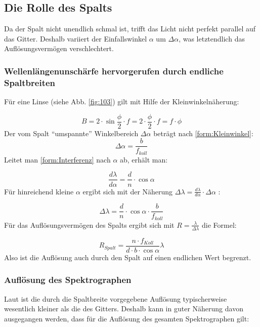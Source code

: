 \subsection{Die Rolle des Spalts}
Da der Spalt nicht unendlich schmal ist, trifft das Licht nicht perfekt parallel auf das Gitter. Deshalb variiert der Einfallswinkel $ \alpha $ um $ \Delta \alpha $, was letztendlich das Auflösungsvermögen verschlechtert.

\subsubsection{Wellenlängenunschärfe hervorgerufen durch endliche Spaltbreiten}
Für eine Linse (siehe Abb. \ref{fig:103}) gilt mit Hilfe der Kleinwinkelnäherung:

\begin{equation}
B = 2\cdot \sin{\frac{\phi}{2}} \cdot f = 2 \cdot \frac{\phi}{2} \cdot f = f \cdot \phi
\label{form:Kleinwinkel}
\end{equation}
Der vom Spalt \enquote{umspannte} Winkelbereich $\Delta \alpha $ beträgt nach \eqref{form:Kleinwinkel}:
\begin{equation}
\Delta \alpha = \frac{b}{f_{koll}}
\end{equation}
Leitet man \eqref{form:Interferenz} nach $ \alpha $ ab, erhält man:

\begin{equation}
\frac{d \lambda}{d \alpha} = \frac{d}{n} \cdot \cos{\alpha}
\end{equation}
Für hinreichend kleine $\alpha$ ergibt sich mit der Näherung $ \Delta \lambda = \frac{d\lambda}{d\alpha} \cdot \Delta \alpha $ :

\begin{equation}
\Delta \lambda = \frac{d}{n} \cdot \cos{\alpha} \cdot \frac{b}{f_{koll}}
\end{equation} 
Für das Auflösungsvermögen des Spalts ergibt sich mit $ R = \frac{\lambda}{\Delta \lambda} $ die Formel:

\begin{equation}
R_{Spalt} = \frac{n \cdot f_{Koll}}{d \cdot b \cdot \cos \alpha} \lambda
\end{equation}
Also ist die Auflösung auch durch den Spalt auf einen endlichen Wert begrenzt.

\subsubsection{Auflösung des Spektrographen}
Laut \cite{ronomischesPraktikum} ist die durch die Spaltbreite vorgegebene Auflösung typischerweise wesentlich kleiner als die des Gitters. Deshalb kann in guter Näherung davon ausgegangen werden, dass für die Auflösung des gesamten Spektrographen gilt:

